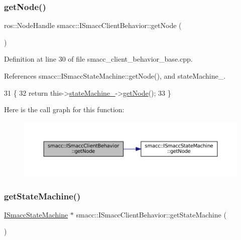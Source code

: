 \subsubsection{\texorpdfstring{get\+Node()}{getNode()}}
{\footnotesize\ttfamily ros\+::\+Node\+Handle smacc\+::\+I\+Smacc\+Client\+Behavior\+::get\+Node (\begin{DoxyParamCaption}{ }\end{DoxyParamCaption})}



Definition at line 30 of file smacc\+\_\+client\+\_\+behavior\+\_\+base.\+cpp.



References smacc\+::\+I\+Smacc\+State\+Machine\+::get\+Node(), and state\+Machine\+\_\+.


\begin{DoxyCode}
31 \{
32   \textcolor{keywordflow}{return} this->\hyperlink{classsmacc_1_1ISmaccClientBehavior_a0fea65db292a8bb3dfba3e5840491d79}{stateMachine\_}->\hyperlink{classsmacc_1_1ISmaccStateMachine_a0b81d4a2875ea203446210a6b349d1c1}{getNode}();
33 \}
\end{DoxyCode}
Here is the call graph for this function\+:
\nopagebreak
\begin{figure}[H]
\begin{center}
\leavevmode
\includegraphics[width=350pt]{classsmacc_1_1ISmaccClientBehavior_ad066319af26db612ba2b6d2f1796daad_cgraph}
\end{center}
\end{figure}
\mbox{\label{classsmacc_1_1ISmaccClientBehavior_a9d55a85bf0a920033805a3c050de2019}} 
\subsubsection{\texorpdfstring{get\+State\+Machine()}{getStateMachine()}}
{\footnotesize\ttfamily \hyperlink{classsmacc_1_1ISmaccStateMachine}{I\+Smacc\+State\+Machine} $\ast$ smacc\+::\+I\+Smacc\+Client\+Behavior\+::get\+State\+Machine (\begin{DoxyParamCaption}{ }\end{DoxyParamCaption})\hspace{0.3cm}{\ttfamily [inline]}}



